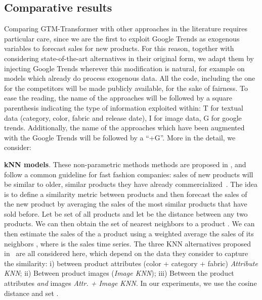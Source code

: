 \documentclass{article}
\newcommand{\approachname}[0] {GTM-Transformer\xspace}
\begin{document}
\subsection{Comparative results}\label{sec:exp:comp}

Comparing \approachname{} with other approaches in the literature requires particular care, since we are the first to exploit Google Trends as exogenous variables to forecast sales for new products. For this reason, together with considering state-of-the-art alternatives in their original form, we adapt them by injecting Google Trends wherever this modification is  natural, for example on models which already do process exogenous data. All the code, including the one for the competitors will be made publicly available, for the sake of fairness. To ease the reading, the name of the approaches will be followed by a square parenthesis indicating the type of information exploited within: T for textual data (category, color, fabric and release date), I for image data, G for google trends. Additionally, the name of the approaches which have been augmented with the Google Trends will be followed by a ``+G''. More in the detail, we consider: 

\textbf{kNN models}. These non-parametric methods methods are proposed in \cite{ekambaram_attention_2020}, and follow a common guideline for fast fashion companies: sales of new products will be similar to older, similar products they have already commercialized~\cite{thomassey2014sales}. The idea is to define a similarity metric between products and then forecast the sales of the new product by averaging the sales of the  most similar products that have sold before. Let  be set of all products and let  be the distance between any two products. We can then obtain the set of  nearest neighbors to a product . We can then estimate the sales of the a product  using a weighted average the sales of its neighbors , where  is the sales time series. The three KNN alternatives proposed in~\cite{ekambaram_attention_2020} are all considered here, which depend on the data they consider to capture the similarity: i) between product attributes (color + category + fabric) \emph{Attribute KNN}; ii) Between product images (\emph{Image KNN}); iii) Between the product attributes \textit{and} images \emph{Attr. + Image KNN}. In our experiments, we use the cosine distance and set .
\end{document}
